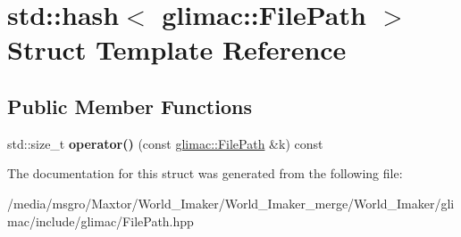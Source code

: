 \hypertarget{structstd_1_1hash_3_01glimac_1_1FilePath_01_4}{}\section{std\+:\+:hash$<$ glimac\+:\+:File\+Path $>$ Struct Template Reference}
\label{structstd_1_1hash_3_01glimac_1_1FilePath_01_4}
\subsection*{Public Member Functions}
\begin{DoxyCompactItemize}
\item 
\mbox{\label{structstd_1_1hash_3_01glimac_1_1FilePath_01_4_aef106b8bc300f85d943f47f631965d37}} 
std\+::size\+\_\+t {\bfseries operator()} (const \hyperlink{classglimac_1_1FilePath}{glimac\+::\+File\+Path} \&k) const
\end{DoxyCompactItemize}


The documentation for this struct was generated from the following file\+:\begin{DoxyCompactItemize}
\item 
/media/msgro/\+Maxtor/\+World\+\_\+\+Imaker/\+World\+\_\+\+Imaker\+\_\+merge/\+World\+\_\+\+Imaker/glimac/include/glimac/File\+Path.\+hpp\end{DoxyCompactItemize}
